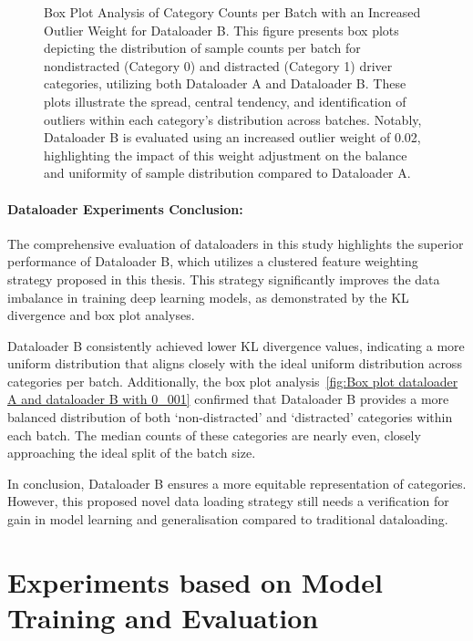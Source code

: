 \begin{figure}[htbp]
    \caption[Box Plot Analysis of Category Counts per Batch with an Increased Outlier Weight for Dataloader B.]{ Box Plot Analysis of Category Counts per Batch with an Increased Outlier Weight for Dataloader B. This figure presents box plots depicting the distribution of sample counts per batch for nondistracted (Category 0) and distracted (Category 1) driver categories, utilizing both Dataloader A and Dataloader B. These plots illustrate the spread, central tendency, and identification of outliers within each category's distribution across batches. Notably, Dataloader B is evaluated using an increased outlier weight of 0.02, highlighting the impact of this weight adjustment on the balance and uniformity of sample distribution compared to Dataloader A.}
    \label{fig:Box plot dataloader A and dataloader B with 0_02}
\end{figure}

\paragraph{Dataloader Experiments Conclusion:}
The comprehensive evaluation of dataloaders in this study highlights the superior performance of Dataloader B, which utilizes a clustered feature weighting strategy proposed in this thesis. This strategy significantly improves the data imbalance in training deep learning models, as demonstrated by the KL divergence and box plot analyses.

Dataloader B consistently achieved lower KL divergence values, indicating a more uniform distribution that aligns closely with the ideal uniform distribution across categories per batch. Additionally, the box plot analysis~\ref{fig:Box plot dataloader A and dataloader B with 0_001} confirmed that Dataloader B provides a more balanced distribution of both `non-distracted' and `distracted' categories within each batch. The median counts of these categories are nearly even, closely approaching the ideal split of the batch size.

In conclusion, Dataloader B ensures a more equitable representation of categories. However, this proposed novel data loading strategy still needs a verification for gain in model learning and generalisation compared to traditional dataloading.

\section{Experiments based on Model Training and Evaluation}
